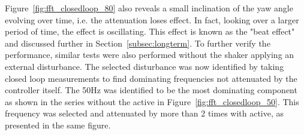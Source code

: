 Figure~\ref{fig:fft_closedloop_80} also reveals a small inclination of the yaw angle evolving over time, i.e. the attenuation loses effect. In fact, looking over a larger period of time, the effect is oscillating. This effect is known as the "beat effect" and discussed further in Section~\ref{subsec:longterm}.
To further verify the performance, similar tests were also performed without the shaker applying an external disturbance. The selected disturbance was now identified by taking closed loop measurements to find dominating frequencies not attenuated by the controller itself. The 50Hz was identified to be the most dominating component as shown in the series without the \abbrRFDC active in Figure~\ref{fig:fft_closedloop_50}. This frequency was selected and attenuated by more than 2 times with \abbrRFDC active, as presented in the same figure.

